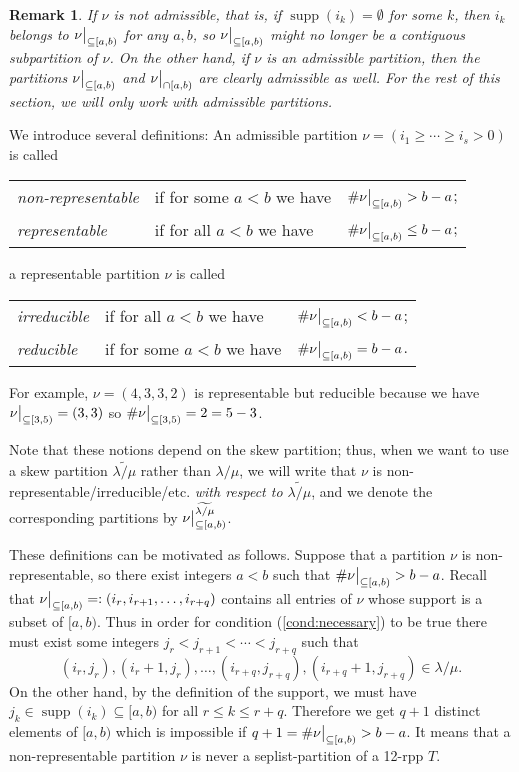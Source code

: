 \documentclass[12pt]{article}
\theoremstyle{plain}
\newtheorem{remark}[theorem]{Remark}
\theoremstyle{definition}
\def\seplistvar{{{\nu}}} %
\def\supp{{\operatorname{supp}}}
\def\lm{{\lambda/\mu}}
\begin{document}
\begin{remark}
 If $\seplistvar$ is not admissible, that is, if $\supp(i_k)=\emptyset$ for some $k$, then $i_k$ belongs to $\nuab$ for any $a,b$, so $\nuab$ might no longer be a contiguous subpartition of $\seplistvar$. On the other hand, if $\seplistvar$ is an admissible partition, then the partitions $\nuab$ and $\nuabcap$ are clearly admissible as well. For the rest of this section, we will only work with admissible partitions.
\end{remark}


We introduce several definitions: An admissible partition $\seplistvar=(i_1\geq \cdots\geq i_s>0)$ is called

\begin{tabular}{@{$\bullet$ }lll}
 \textit{non-representable} & if for some $a<b$ we have & $\#\nuab>b-a$;\\
 \textit{representable}& if for all $a<b$ we have& $\#\nuab\leq b-a$;\\
\end{tabular}

a representable partition $\seplistvar$ is called

\begin{tabular}{@{$\bullet$ }lll} 
 \textit{irreducible}& if for all  $a<b$ we have &$\#\nuab < b-a$;\\
 \textit{reducible} &if for some $a<b$ we have &$\#\nuab=b-a$.
\end{tabular}

For example, $\seplistvar=(4,3,3,2)$ is representable but reducible because we have $\nuxy{3}{5}=(3,3)$ so $\#\nuxy{3}{5}=2=5-3$.

Note that these notions depend on the skew partition; thus, when we want to use a skew partition $\widetilde\lm$ rather than $\lm$, we will write that $\seplistvar$ is non-representable/irreducible/etc. \textit{with respect to $\widetilde\lm$}, and we denote the corresponding partitions by $\nuab^{\widetilde{\lm}}$.

These definitions can be motivated as follows. Suppose that a partition $\seplistvar$ is non-representable, so there exist integers $a<b$ such that $\#\nuab>b-a$. Recall that $\nuab=:(i_r,i_{r+1},\dots,i_{r+q})$ contains all entries of $\seplistvar$ whose support is a subset of $[a,b)$. Thus in order for condition (\ref{cond:necessary}) to be true there must exist some integers $j_r<j_{r+1}<\cdots<j_{r+q}$ such that 
$$(i_r, j_r),(i_r+1, j_r),\dots,(i_{r+q},j_{r+q}),(i_{r+q}+1,j_{r+q})\in\lm.$$
On the other hand, by the definition of the support, we must have $j_k\in \supp(i_k)\subseteq [a,b)$ for all $r\leq k\leq r+q$. Therefore we get $q+1$ distinct elements of $[a,b)$ which is impossible if $q+1=\#\nuab>b-a$. It means that a non-representable partition $\seplistvar$ is never a seplist-partition of a 12-rpp $T$. 
\end{document}
